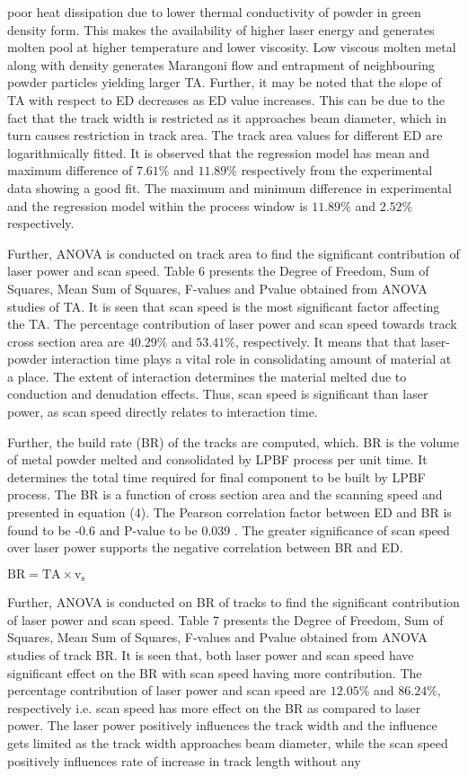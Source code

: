 \documentclass[10pt]{article}
\begin{document}
poor heat dissipation due to lower thermal conductivity of powder in green density form. This makes the availability of higher laser energy and generates molten pool at higher temperature and lower viscosity. Low viscous molten metal along with density generates Marangoni flow and entrapment of neighbouring powder particles yielding larger TA. Further, it may be noted that the slope of TA with respect to ED decreases as ED value increases. This can be due to the fact that the track width is restricted as it approaches beam diameter, which in turn causes restriction in track area. The track area values for different ED are logarithmically fitted. It is observed that the regression model has mean and maximum difference of $7.61 \%$ and $11.89 \%$ respectively from the experimental data showing a good fit. The maximum and minimum difference in experimental and the regression model within the process window is $11.89 \%$ and $2.52 \%$ respectively.

Further, ANOVA is conducted on track area to find the significant contribution of laser power and scan speed. Table 6 presents the Degree of Freedom, Sum of Squares, Mean Sum of Squares, F-values and Pvalue obtained from ANOVA studies of TA. It is seen that scan speed is the most significant factor affecting the TA. The percentage contribution of laser power and scan speed towards track cross section area are $40.29 \%$ and $53.41 \%$, respectively. It means that that laser-powder interaction time plays a vital role in consolidating amount of material at a place. The extent of interaction determines the material melted due to conduction and denudation effects. Thus, scan speed is significant than laser power, as scan speed directly relates to interaction time.

Further, the build rate (BR) of the tracks are computed, which. BR is the volume of metal powder melted and consolidated by LPBF process per unit time. It determines the total time required for final component to be built by LPBF process. The BR is a function of cross section area and the scanning speed and presented in equation (4). The Pearson correlation factor between ED and BR is found to be -0.6 and P-value to be 0.039 . The greater significance of scan speed over laser power supports the negative correlation between BR and ED.

$\mathrm{BR}=\mathrm{TA} \times \mathrm{v}_{\mathrm{s}}$

Further, ANOVA is conducted on BR of tracks to find the significant contribution of laser power and scan speed. Table 7 presents the Degree of Freedom, Sum of Squares, Mean Sum of Squares, F-values and Pvalue obtained from ANOVA studies of track BR. It is seen that, both laser power and scan speed have significant effect on the BR with scan speed having more contribution. The percentage contribution of laser power and scan speed are $12.05 \%$ and $86.24 \%$, respectively i.e. scan speed has more effect on the BR as compared to laser power. The laser power positively influences the track width and the influence gets limited as the track width approaches beam diameter, while the scan speed positively influences rate of increase in track length without any
\end{document}
